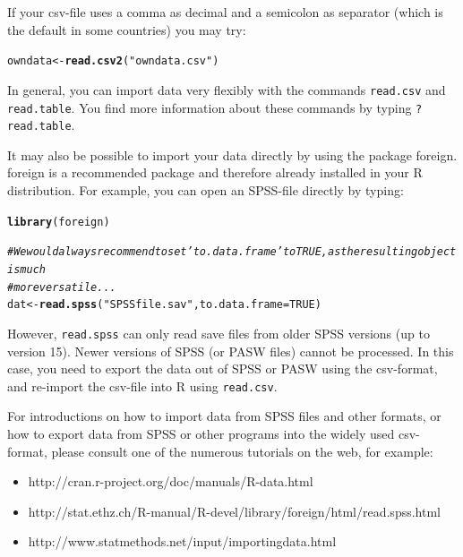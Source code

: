 \documentclass[a4paper]{article}\usepackage[]{graphicx}\usepackage[]{color}
\makeatletter
\newcommand{\hlnum}[1]{\textcolor[rgb]{0.686,0.059,0.569}{#1}}%
\newcommand{\hlstr}[1]{\textcolor[rgb]{0.192,0.494,0.8}{#1}}%
\newcommand{\hlcom}[1]{\textcolor[rgb]{0.678,0.584,0.686}{\textit{#1}}}%
\newcommand{\hlstd}[1]{\textcolor[rgb]{0.345,0.345,0.345}{#1}}%
\newcommand{\hlkwb}[1]{\textcolor[rgb]{0.69,0.353,0.396}{#1}}%
\newcommand{\hlkwc}[1]{\textcolor[rgb]{0.333,0.667,0.333}{#1}}%
\newcommand{\hlkwd}[1]{\textcolor[rgb]{0.737,0.353,0.396}{\textbf{#1}}}%
\newenvironment{kframe}{%
 \def\at@end@of@kframe{}%
 \ifinner\ifhmode%
  \def\at@end@of@kframe{\end{minipage}}%
  \begin{minipage}{\columnwidth}%
 \fi\fi%
 \def\FrameCommand##1{\hskip\@totalleftmargin \hskip-\fboxsep
 \colorbox{shadecolor}{##1}\hskip-\fboxsep
     \hskip-\linewidth \hskip-\@totalleftmargin \hskip\columnwidth}%
 \MakeFramed {\advance\hsize-\width
   \@totalleftmargin\z@ \linewidth\hsize
   \@setminipage}}%
 {\par\unskip\endMakeFramed%
 \at@end@of@kframe}
\newenvironment{knitrout}{}{} %
\makeatother
\begin{document}
If your csv-file uses a comma as decimal and a semicolon as separator (which is the default in some countries) you may try:
\begin{knitrout}\small
{}\color{fgcolor}\begin{kframe}
\begin{alltt}
\hlstd{owndata} \hlkwb{<-} \hlkwd{read.csv2}\hlstd{(}\hlstr{"owndata.csv"}\hlstd{)}
\end{alltt}
\end{kframe}
\end{knitrout}

In general, you can import data very flexibly with the commands \texttt{read.csv} and \texttt{read.table}. You find more information about these commands by typing \texttt{?read.table}.  
  
It may also be possible to import your data directly by using the package foreign. foreign is a recommended package and therefore already installed in your R distribution. For example, you can open an SPSS-file directly by typing:

\begin{knitrout}\small
{}\color{fgcolor}\begin{kframe}
\begin{alltt}
\hlkwd{library}\hlstd{(foreign)}

\hlcom{# We would always recommend to set 'to.data.frame' to TRUE, as the resulting object is much}
\hlcom{# more versatile ...}
\hlstd{dat} \hlkwb{<-} \hlkwd{read.spss}\hlstd{(}\hlstr{"SPSSfile.sav"}\hlstd{,} \hlkwc{to.data.frame} \hlstd{=} \hlnum{TRUE}\hlstd{)}
\end{alltt}
\end{kframe}
\end{knitrout}

However, \texttt{read.spss} can only read save files from older SPSS versions (up to version 15). Newer versions of SPSS (or PASW files) cannot be processed. In this case, you need to export the data out of SPSS or PASW using the csv-format, and re-import the csv-file into R using \texttt{read.csv}.

For introductions on how to import data from SPSS files and other formats, or how to export data from SPSS or other programs into the widely used csv-format, please consult one of the numerous tutorials on the web, for example:
\begin{itemize}
	\item http://cran.r-project.org/doc/manuals/R-data.html
	\item http://stat.ethz.ch/R-manual/R-devel/library/foreign/html/read.spss.html
	\item http://www.statmethods.net/input/importingdata.html
\end{itemize}
\end{document}
